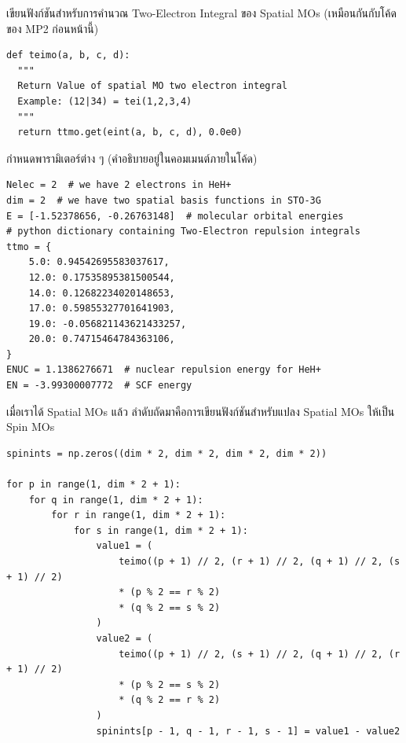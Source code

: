 \vspace{5pt}

\noindent เขียนฟังก์ชันสำหรับการคำนวณ Two-Electron Integral ของ Spatial MOs (เหมือนกันกับโค้ดของ MP2 ก่อนหน้านี้)

\vspace{5pt}

\begin{lstlisting}[style=MyPython]
def teimo(a, b, c, d):
  """
  Return Value of spatial MO two electron integral
  Example: (12|34) = tei(1,2,3,4)
  """
  return ttmo.get(eint(a, b, c, d), 0.0e0)
\end{lstlisting}

\vspace{5pt}

\noindent กำหนดพารามิเตอร์ต่าง ๆ (คำอธิบายอยู่ในคอมเมนต์ภายในโค้ด)

\vspace{5pt}

\begin{lstlisting}[style=MyPython]
Nelec = 2  # we have 2 electrons in HeH+
dim = 2  # we have two spatial basis functions in STO-3G
E = [-1.52378656, -0.26763148]  # molecular orbital energies
# python dictionary containing Two-Electron repulsion integrals
ttmo = {
    5.0: 0.94542695583037617,
    12.0: 0.17535895381500544,
    14.0: 0.12682234020148653,
    17.0: 0.59855327701641903,
    19.0: -0.056821143621433257,
    20.0: 0.74715464784363106,
}
ENUC = 1.1386276671  # nuclear repulsion energy for HeH+
EN = -3.99300007772  # SCF energy
\end{lstlisting}

\vspace{5pt}

\noindent เมื่อเราได้ Spatial MOs แล้ว ลำดับถัดมาคือการเขียนฟังก์ชันสำหรับแปลง Spatial MOs ให้เป็น Spin MOs

\vspace{5pt}

\begin{lstlisting}[style=MyPython]
spinints = np.zeros((dim * 2, dim * 2, dim * 2, dim * 2))

for p in range(1, dim * 2 + 1):
    for q in range(1, dim * 2 + 1):
        for r in range(1, dim * 2 + 1):
            for s in range(1, dim * 2 + 1):
                value1 = (
                    teimo((p + 1) // 2, (r + 1) // 2, (q + 1) // 2, (s + 1) // 2)
                    * (p % 2 == r % 2)
                    * (q % 2 == s % 2)
                )
                value2 = (
                    teimo((p + 1) // 2, (s + 1) // 2, (q + 1) // 2, (r + 1) // 2)
                    * (p % 2 == s % 2)
                    * (q % 2 == r % 2)
                )
                spinints[p - 1, q - 1, r - 1, s - 1] = value1 - value2
\end{lstlisting}

